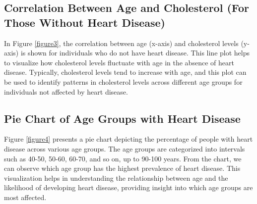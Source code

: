 \documentclass{article}
\begin{document}
	\subsection{Correlation Between Age and Cholesterol (For Those Without Heart Disease)}
	
	In Figure \ref{figure3}, the correlation between age (x-axis) and cholesterol levels (y-axis) is shown for individuals who do not have heart disease. This line plot helps to visualize how cholesterol levels fluctuate with age in the absence of heart disease. Typically, cholesterol levels tend to increase with age, and this plot can be used to identify patterns in cholesterol levels across different age groups for individuals not affected by heart disease.
	
	\subsection{Pie Chart of Age Groups with Heart Disease}
	
	Figure \ref{figure4} presents a pie chart depicting the percentage of people with heart disease across various age groups. The age groups are categorized into intervals such as 40-50, 50-60, 60-70, and so on, up to 90-100 years. From the chart, we can observe which age group has the highest prevalence of heart disease. This visualization helps in understanding the relationship between age and the likelihood of developing heart disease, providing insight into which age groups are most affected.
\end{document}
